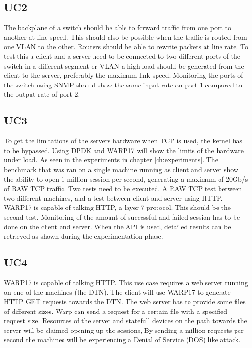 \subsection{UC2}
The backplane of a switch should be able to forward traffic from one port to another at line speed. This should also be possible when the traffic is routed from one VLAN to the other. Routers should be able to rewrite packets at line rate. To test this a client and a server need to be connected to two different ports of the switch in a different segment or VLAN a high load should be generated from the client to the server, preferably the maximum link speed. Monitoring the ports of the switch using SNMP should show the same input rate on port 1 compared to the output rate of port 2.    

\subsection{UC3}
To get the limitations of the servers hardware when TCP is used, the kernel has to be bypassed. Using DPDK and WARP17 will show the limits of the hardware under load. As seen in the experiments in chapter \ref{ch:experiments}. The benchmark that was ran on a single machine running as client and server show the ability to open 1 million session per second, generating a maximum of 20Gb/s of RAW TCP traffic. Two tests need to be executed. A RAW TCP test between two different machines, and a test between client and server using HTTP. WARP17 is capable of talking HTTP, a layer 7 protocol. This should be the second test. Monitoring of the amount of successful and failed session has to be done on the client and server. When the API is used, detailed results can be retrieved as shown during the experimentation phase.   

\subsection{UC4}
WARP17 is capable of talking HTTP. This use case requires a web server running on one of the machines (the DTN). The client will use WARP17 to generate HTTP GET requests towards the DTN. The web server has to provide some files of different sizes. Warp can send a request for a certain file with a specified request size. Resources of the server and statefull devices on the path towards the server will be claimed opening up the sessions, By sending a million requests per second the machines will be experiencing a Denial of Service (DOS) like attack.


